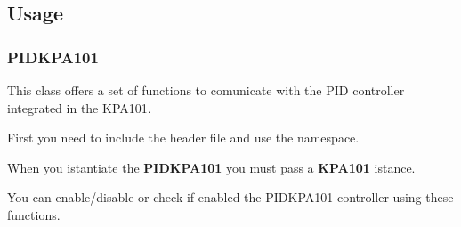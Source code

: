 \hypertarget{usage}{%
\subsection{Usage}\label{usage}}

\hypertarget{pidkpa101}{%
\subsubsection{PIDKPA101}\label{pidkpa101}}

This class offers a set of functions to comunicate with the PID
controller integrated in the KPA101.

First you need to include the header file and use the namespace.

\begin{Shaded}
\begin{Highlighting}[]
 
\end{Highlighting}
\end{Shaded}

When you istantiate the \textbf{PIDKPA101} you must pass a
\textbf{KPA101} istance.

\begin{Shaded}
\begin{Highlighting}[]
\end{Highlighting}
\end{Shaded}

You can enable/disable or check if enabled the PIDKPA101 controller
using these functions.

\begin{Shaded}
\begin{Highlighting}[]
\NormalTok{);}
\NormalTok{);}
\end{Highlighting}
\end{Shaded}


